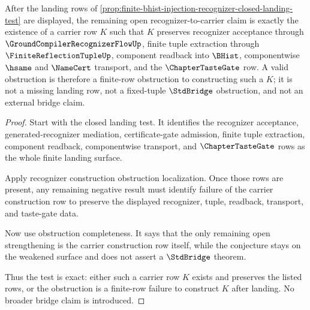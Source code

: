 \begin{theorem}
\label{thm:finite-bhist-injection-recognizer-finite-row-obstruction-test}
After the landing rows of \autoref{prop:finite-bhist-injection-recognizer-closed-landing-test} are displayed, the remaining open recognizer-to-carrier claim is exactly the existence of a carrier row $K$ such that $K$ preserves recognizer acceptance through $\GroundCompilerRecognizerFlowUp$, finite tuple extraction through $\FiniteReflectionTupleUp$, component readback into $\BHist$, componentwise $\hsame$ and $\NameCert$ transport, and the $\ChapterTasteGate$ row. A valid obstruction is therefore a finite-row obstruction to constructing such a $K$; it is not a missing landing row, not a fixed-tuple $\StdBridge$ obstruction, and not an external bridge claim.
\end{theorem}
\begin{proof}
Start with the closed landing test. It identifies the recognizer acceptance, generated-recognizer mediation, certificate-gate admission, finite tuple extraction, component readback, componentwise transport, and $\ChapterTasteGate$ rows as the whole finite landing surface.

Apply recognizer construction obstruction localization. Once those rows are present, any remaining negative result must identify failure of the carrier construction row to preserve the displayed recognizer, tuple, readback, transport, and taste-gate data.

Now use obstruction completeness. It says that the only remaining open strengthening is the carrier construction row itself, while the conjecture stays on the weakened surface and does not assert a $\StdBridge$ theorem.

Thus the test is exact: either such a carrier row $K$ exists and preserves the listed rows, or the obstruction is a finite-row failure to construct $K$ after landing. No broader bridge claim is introduced.
\end{proof}

